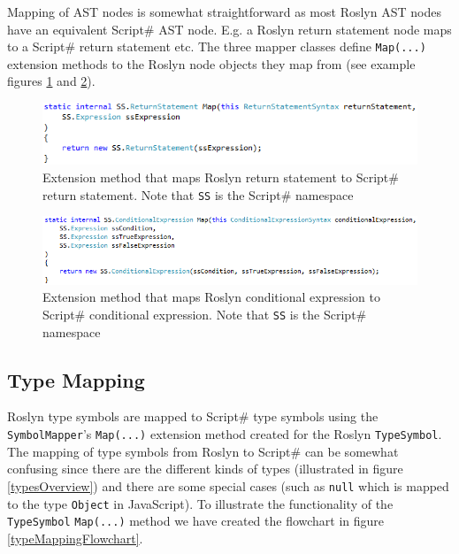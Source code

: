 		Mapping of AST nodes is somewhat straightforward as most Roslyn AST nodes have an equivalent Script\# AST node. E.g. a Roslyn return statement node maps to a Script\# return statement etc. The three mapper classes define \texttt{Map(...)} extension methods to the Roslyn node objects they map from (see example figures \ref{returnStatementMap} and \ref{conditionaleExpressionMap}).

		\begin{figure}[H]
			\begin{center}
				\centerline{\includegraphics[width=14cm]{resources/images/ReturnStatementMap.png}}
			\end{center}
			\caption{Extension method that maps Roslyn return statement to Script\# return statement. Note that \texttt{SS} is the Script\# namespace}
			\label{returnStatementMap}
		\end{figure}

		\begin{figure}[H]
			\begin{center}
				\centerline{\includegraphics[width=14cm]{resources/images/ConditionalExpressionMap.png}}
			\end{center}
			\caption{Extension method that maps Roslyn conditional expression to Script\# conditional expression. Note that \texttt{SS} is the Script\# namespace}
			\label{conditionaleExpressionMap}
		\end{figure}

	\subsection{Type Mapping} %
	\label{sub:type_mapping}
		Roslyn type symbols are mapped to Script\# type symbols using the \texttt{SymbolMapper}’s \texttt{Map(...)} extension method created for the Roslyn \texttt{TypeSymbol}. The mapping of type symbols from Roslyn to Script\# can be somewhat confusing since there are the different kinds of types (illustrated in figure \ref{typesOverview}) and there are some special cases (such as \texttt{null} which is mapped to the type \texttt{Object} in JavaScript). To illustrate the functionality of the \texttt{TypeSymbol} \texttt{Map(...)} method we have created the flowchart in figure \ref{typeMappingFlowchart}.

